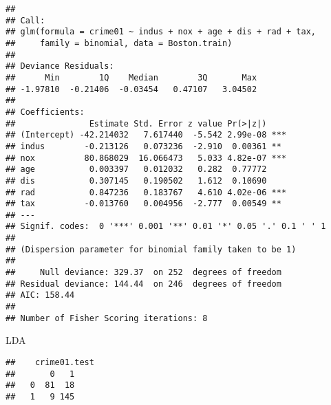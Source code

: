 \documentclass[
]{article}
\newenvironment{Shaded}{\begin{snugshade}}{\end{snugshade}}
\newcommand{\AttributeTok}[1]{\textcolor[rgb]{0.77,0.63,0.00}{#1}}
\newcommand{\FunctionTok}[1]{\textcolor[rgb]{0.00,0.00,0.00}{#1}}
\newcommand{\NormalTok}[1]{#1}
\newcommand{\OtherTok}[1]{\textcolor[rgb]{0.56,0.35,0.01}{#1}}
\newcommand{\SpecialCharTok}[1]{\textcolor[rgb]{0.00,0.00,0.00}{#1}}
\begin{document}
\begin{verbatim}
## 
## Call:
## glm(formula = crime01 ~ indus + nox + age + dis + rad + tax, 
##     family = binomial, data = Boston.train)
## 
## Deviance Residuals: 
##      Min        1Q    Median        3Q       Max  
## -1.97810  -0.21406  -0.03454   0.47107   3.04502  
## 
## Coefficients:
##               Estimate Std. Error z value Pr(>|z|)    
## (Intercept) -42.214032   7.617440  -5.542 2.99e-08 ***
## indus        -0.213126   0.073236  -2.910  0.00361 ** 
## nox          80.868029  16.066473   5.033 4.82e-07 ***
## age           0.003397   0.012032   0.282  0.77772    
## dis           0.307145   0.190502   1.612  0.10690    
## rad           0.847236   0.183767   4.610 4.02e-06 ***
## tax          -0.013760   0.004956  -2.777  0.00549 ** 
## ---
## Signif. codes:  0 '***' 0.001 '**' 0.01 '*' 0.05 '.' 0.1 ' ' 1
## 
## (Dispersion parameter for binomial family taken to be 1)
## 
##     Null deviance: 329.37  on 252  degrees of freedom
## Residual deviance: 144.44  on 246  degrees of freedom
## AIC: 158.44
## 
## Number of Fisher Scoring iterations: 8
\end{verbatim}

LDA

\begin{Shaded}
\end{Shaded}

\begin{verbatim}
##    crime01.test
##       0   1
##   0  81  18
##   1   9 145
\end{verbatim}

\begin{Shaded}
\end{Shaded}
\end{document}

